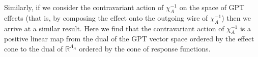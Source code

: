 \documentclass[onecolum,aps,groupedaddress,nofootinbib]{revtex4-2}
\begin{document}
Similarly, if we consider the contravariant action of $\chi^{-1}_A$ on the space of GPT effects (that is, by composing the effect onto the outgoing wire of $\chi^{-1}_A$) then we arrive at a similar result. Here we find that the contravariant action of $\chi^{-1}_A$ is a positive linear map from the dual of the GPT vector space ordered by the effect cone to the dual of $\mathds{R}^{\Lambda_A}$ ordered by the cone of response functions.
\endproof
\end{document}
